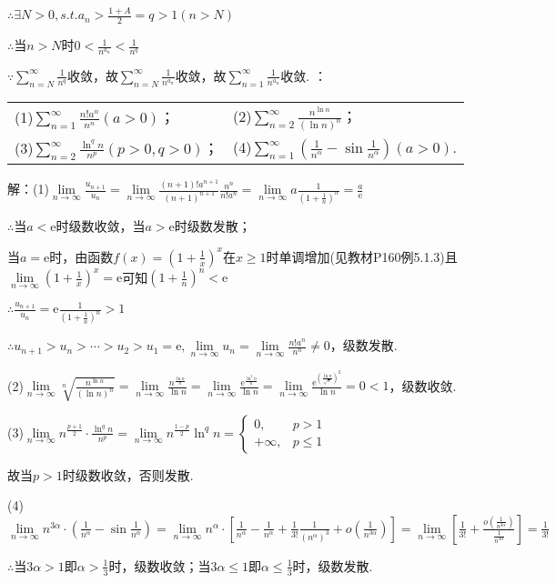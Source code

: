 \documentclass[12pt,UTF8]{ctexart}
\newcommand\Lim[0]{\lim\limits_{n\rightarrow\infty}}
\newcommand\Ser[1]{\sum_{n=#1}^\infty}
\begin{document}
\begin{enumerate}
$\therefore\exists N>0,s.t.a_n>\frac{1+A}2=q>1(n>N)$

$\therefore$当$n>N$时$0<\frac1{n^{a_n}}<\frac1{n^q}$

$\because\Ser{N}\frac1{n^q}$收敛，故$\Ser{N}\frac1{n^{a_n}}$收敛，故$\Ser{1}\frac1{n^{a_n}}$收敛.
：
\newline
\begin{tabular}{ll}
(1)$\Ser{1}\frac{n!a^n}{n^n}(a>0)$；&(2)$\Ser{2}\frac{n^{\ln n}}{(\ln n)^n}$；\\
(3)$\Ser{2}\frac{\ln^qn}{n^p}(p>0,q>0)$；&(4)$\Ser{1}(\frac1{n^\alpha}-\sin\frac1{n^\alpha})(a>0)$.
\end{tabular}

解：(1)$\Lim\frac{u_{n+1}}{u_n}=\Lim\frac{(n+1)!a^{n+1}}{(n+1)^{n+1}}\frac{n^n}{n!a^n}=\Lim a\frac1{(1+\frac1n)^n}=\frac a{\mathrm e}$

$\therefore$当$a<\mathrm e$时级数收敛，当$a>\mathrm e$时级数发散；

当$a=\mathrm e$时，由函数$f(x)=(1+\frac1x)^x$在$x\geq1$时单调增加(见教材P160例5.1.3)且$\Lim(1+\frac1x)^x=\mathrm e$可知$(1+\frac1n)^n<\mathrm e$

$\therefore\frac{u_{n+1}}{u_n}=\mathrm e\frac1{(1+\frac1n)^n}>1$

$\therefore u_{n+1}>u_n>\cdots>u_2>u_1=\mathrm e,\Lim u_n=\Lim\frac{n!a^n}{n^n}\neq0$，级数发散.

(2)$\Lim\sqrt[n]{\frac{n^{\ln n}}{(\ln n)^n}}=\Lim\frac{n^{\frac{\ln n}n}}{\ln n}=\Lim\frac{\mathrm e^{\frac{\ln^2n}n}}{\ln n}=\Lim\frac{\mathrm e^{(\frac{\ln n}{\sqrt n})^2}}{\ln n}=0<1$，级数收敛.

(3)$\Lim n^{\frac{p+1}2}\cdot\frac{\ln^qn}{n^p}=\Lim n^{\frac{1-p}2}\ln^qn=\begin{cases}
0,&p>1\\
+\infty,&p\leq1
\end{cases}$

故当$p>1$时级数收敛，否则发散.

(4)$\Lim n^{3\alpha}\cdot(\frac1{n^\alpha}-\sin\frac1{n^\alpha})=\Lim n^\alpha\cdot[\frac1{n^\alpha}-\frac1{n^\alpha}+\frac1{3!}\frac1{(n^\alpha)^3}+o(\frac1{n^{3\alpha}})]=\Lim[\frac1{3!}+\frac{o(\frac1{n^{3\alpha}})}{\frac1{n^{3\alpha}}}]=\frac1{3!}$

$\therefore$当$3\alpha>1$即$\alpha>\frac13$时，级数收敛；当$3\alpha\leq1$即$\alpha\leq\frac13$时，级数发散.
\end{enumerate}
\end{document}
